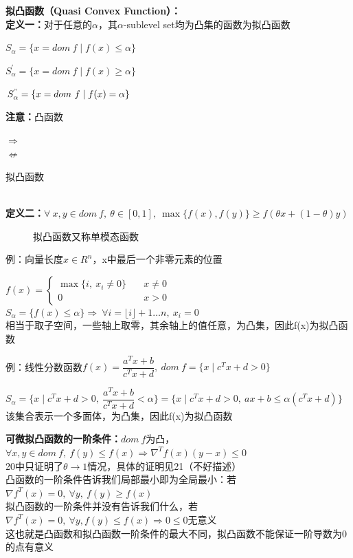\documentclass[11pt]{ctexart}         %
\newcommand{\rebacklinespread}[1][-12pt]{\vspace{#1}}
\newcommand{\oneline}[1][12pt]{\vspace{#1}}
\newcommand{\premise}[1][dom\ f]{\forall\ x,y\in #1,\ \theta\in [0,1]}
\newcommand{\linearcombine}[2]{\theta #1+(1-\theta)#2}
\newcommand{\dom}[1]{$dom\ #1$}
\newcommand{\rs}[2][R]{#1^{#2}} %
\newcommand{\bc}[1]{\begin{cases}#1\end{cases}}
\newcommand{\li}[3][例]{
	#1：#2\\ 
	\phantom{#1：}\begin{minipage}[t]{0.9\linewidth}%
	\setlength\parskip{12pt}
	#3
	\end{minipage}
	\oneline}
\newcommand{\sune}{\parbox{1em}{$ \Rightarrow $\\ [-10pt] $ \nLeftarrow $}} %
\newcommand{\paint}[2][red]{{\color{#1}#2}} %
\begin{document}
\textbf{拟凸函数（Quasi Convex Function）：}\\ [8pt]
\textbf{定义一：}对于任意的$\alpha$，其$\alpha$-sublevel set均为凸集的函数为拟凸函数
\rebacklinespread
\begin{description}[itemsep=0pt,parsep=0pt,topsep=0pt]
	\item[Quasi Convex] $ S_\alpha=\{x=dom\ f\mid f(x)\leq\alpha\} $
	\item[Quasi Concave] $ S^{'}_\alpha=\{x=dom\ f\mid f(x)\geq\alpha\} $
	\item[Quasi Linear] $ S^"_\alpha=\{x=dom\ f\mid f(x)=\alpha\} $
\end{description}
\rebacklinespread
\paint{\textbf{注意：}凸函数 \sune 拟凸函数}\\ [8pt]
\textbf{定义二：}$ \premise,\ \max\{f(x),f(y)\}\geq f(\linearcombine{x}{y}) $\\
\begin{figure}[h]
	\centering
	\quad
	\caption{拟凸函数又称单模态函数}
\end{figure}

\li{向量长度$ x\in\rs{n} $，x中最后一个非零元素的位置}{
	$f(x)=\bc{
		\max\{i,\ x_i\neq 0\}\quad& x\neq 0\\ 
		0\quad&x>0
	}$\\
	$ S_\alpha=\{f(x)\leq \alpha\}\Rightarrow\ \forall i=\lfloor i\rfloor+1\dots n,\ x_i=0 $\\
	相当于取子空间，一些轴上取零，其余轴上的值任意，为凸集，因此f(x)为拟凸函数
}

\li{线性分数函数$ f(x)=\dfrac{a^Tx+b}{c^Tx+d},\ dom\ f=\{x\mid c^Tx+d>0\} $}{
	$ S_\alpha=\{x\mid c^Tx+d>0,\ \dfrac{a^Tx+b}{c^Tx+d}<\alpha\}=\{x\mid c^Tx+d>0,\ ax+b\leq\alpha(c^Tx+d)\}$\\ [8pt]
	该集合表示一个多面体，为凸集，因此f(x)为拟凸函数
}

\textbf{可微拟凸函数的一阶条件：}\dom{f}为凸，$ \forall x,y\in dom\ f,\ f(y)\leq f(x)\Rightarrow\nabla^Tf(x)(y-x)\leq  0 $\\
\paint[blue]{20中只证明了$\theta\to 1$情况，具体的证明见21（不好描述）}\\
\paint{凸函数的一阶条件告诉我们局部最小即为全局最小：若$ \nabla f^T(x)=0,\ \forall y,\ f(y)\geq f(x) $\\拟凸函数的一阶条件并没有告诉我们什么，若$ \nabla f^T(x)=0,\ \forall y, f(y)\leq f(x)\Rightarrow 0\leq 0 $无意义\\
这也就是凸函数和拟凸函数一阶条件的最大不同，拟凸函数不能保证一阶导数为0的点有意义}
\end{document}
